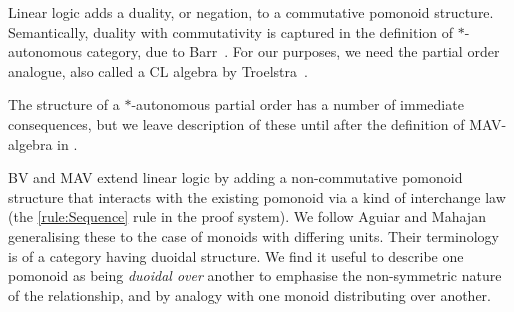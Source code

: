 
Linear logic adds a duality, or negation, to a commutative
pomonoid structure. Semantically, duality with commutativity is
captured in the definition of $*$-autonomous category, due to Barr~\cite{Barr_1979}. For our purposes, we need the partial order
analogue, also called a CL algebra by Troelstra~\cite{Troelstra92:lll}.


\begin{rem}
  The structure of a $*$-autonomous partial order has a number of
  immediate consequences, but we leave description of these until
  after the definition of MAV-algebra in .
\end{rem}

BV and MAV extend linear logic by adding a non-commutative pomonoid
structure that interacts with the existing pomonoid via a kind of
interchange law (the \cref{rule:Sequence} rule in the proof
system). We follow Aguiar and Mahajan \cite[Definition 6.1]{Aguiar_2010} generalising
these to the case of monoids with differing units. Their terminology
is of a category having duoidal structure. We find it useful to
describe one pomonoid as being \emph{duoidal over} another to
emphasise the non-symmetric nature of the relationship, and by analogy
with one monoid distributing over another.


